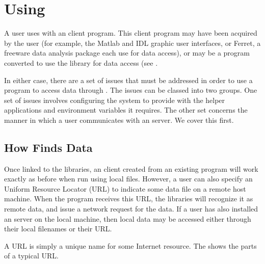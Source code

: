 %
%


\chapter{Using \opendap}
\label{opd,using}

A user uses \opendap with an \opendap client program.  This client program may
have been acquired by the user (for example, the \opendap Matlab and IDL
graphic user interfaces, or Ferret, a freeware data analysis package
each use \opendap for data access), or may be a program converted to
use the \opendap library for data access (see .

In either case, there are a set of issues that must be addressed in
order to use a program to access data through \opendap.  The issues can be
classed into two groups.  One set of issues involves configuring the
system to provide \opendap with the helper applications and environment
variables it requires.  The other set concerns the manner in which a
user communicates with an \opendap server.  We cover this first.

\section{How \opendap Finds Data}
\label{opd-client,url}

  Once linked to the
\opendap libraries, an \opendap client created from an existing program will
work exactly as before when run using local files.  However, a user
can also specify an \opendap Uniform Resource Locator (URL) to indicate
some data file on a remote host machine.  When the program receives
this URL, the \opendap libraries will recognize it as remote data, and
issue a network request for the data.  If a user has also installed
an \opendap server on the local machine, then local data may be accessed
either through their local filenames or their \opendap URL.

A URL is simply a unique name for some Internet resource.  
The  shows the parts of a 
typical \opendap URL.

